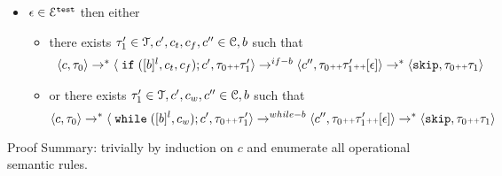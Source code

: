 \begin{lem}
\begin{itemize}
\item $\mathtt{\epsilon}\in \mathcal{E}^{\mathtt{{test}}}$ then either 
\begin{itemize}
\item there exists $\mathtt{\tau}_1' \in \mathcal{T}, c', c_t, c_f, c'' \in \mathcal{C}, b$ such that
\[
\begin{array}{l}
		\langle c, \mathtt{\tau}_0 \rangle \rightarrow^* \langle \;\mathtt{if}\; ([b]^l, c_t, c_f);c', \mathtt{\tau}_0 {\scriptscriptstyle ++} \mathtt{\tau}_1' \rangle \rightarrow^{if-b}
		\langle c'', \mathtt{\tau}_0 {\scriptscriptstyle ++} \mathtt{\tau}_1'{\scriptscriptstyle ++} [\mathtt{\epsilon}]  \rangle \rightarrow^{*}
		\langle \mathtt{skip}, \mathtt{\tau}_0 {\scriptscriptstyle ++} \mathtt{\tau}_1 \rangle 
\end{array}
\]
\item or there exists $ \mathtt{\tau}_1' \in \mathcal{T}, c', c_w, c'' \in \mathcal{C}, b$ such that 
\[
		\langle c, \mathtt{\tau}_0 \rangle \rightarrow^* \langle  \;\mathtt{while}\;([b]^l, c_w);c', \mathtt{\tau}_0 {\scriptscriptstyle ++}  \mathtt{\tau}_1' \rangle \rightarrow^{while-b}
		\langle c'', \mathtt{\tau}_0 {\scriptscriptstyle ++} \mathtt{\tau}_1'{\scriptscriptstyle ++} [\mathtt{\epsilon}]  \rangle \rightarrow^{*}
		\langle \mathtt{skip}, \mathtt{\tau}_0  {\scriptscriptstyle ++} \mathtt{\tau}_1 \rangle
\]
\end{itemize}
\end{itemize}
%
\end{lem}
Proof Summary: trivially by induction on $c$ and enumerate all operational semantic rules.
